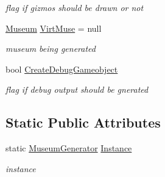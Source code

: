 \begin{DoxyCompactItemize}
\begin{DoxyCompactList}\small\item\em flag if gizmos should be drawn or not \end{DoxyCompactList}\item 
\mbox{\hyperlink{class_museum}{Museum}} \mbox{\hyperlink{class_museum_generator_abd9c3bf24730c6ad36b0ae78838ffaa8}{Virt\+Muse}} = null
\begin{DoxyCompactList}\small\item\em museum being generated \end{DoxyCompactList}\item 
bool \mbox{\hyperlink{class_museum_generator_a09fab0187bd69fd0c13220168b4a7ad2}{Create\+Debug\+Gameobject}}
\begin{DoxyCompactList}\small\item\em flag if debug output should be gnerated \end{DoxyCompactList}\end{DoxyCompactItemize}
\subsection*{Static Public Attributes}
\begin{DoxyCompactItemize}
\item 
static \mbox{\hyperlink{class_museum_generator}{Museum\+Generator}} \mbox{\hyperlink{class_museum_generator_ab3655c1b58520b049e4ca4f80744180a}{Instance}}
\begin{DoxyCompactList}\small\item\em instance \end{DoxyCompactList}\end{DoxyCompactItemize}
